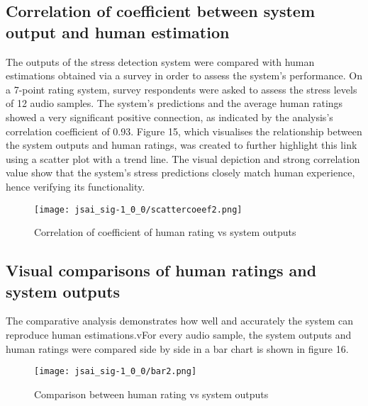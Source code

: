 \documentclass[a4j, twocolumn]{article}
\begin{document}
    \subsection{Correlation of coefficient between system output and human estimation}
    The outputs of the stress detection system were compared with human estimations obtained via a survey in order to assess the system's performance. On a 7-point rating system, survey respondents were asked to assess the stress levels of 12 audio samples. The system's predictions and the average human ratings showed a very significant positive connection, as indicated by the analysis's correlation coefficient of 0.93. Figure 15, which visualises the relationship between the system outputs and human ratings, was created to further highlight this link using a scatter plot with a trend line. The visual depiction and strong correlation value show that the system's stress predictions closely match human experience, hence verifying its functionality.
    \vspace{10pt} %
\begin{figure}[H]
    \centering
    \texttt{[image: jsai\_sig-1\_0\_0/scattercoeef2.png]}
    \caption{Correlation of coefficient of human rating vs system outputs}
    \label{fig:system_architecture}
\end{figure}
\vspace{10pt} %
\subsection{Visual comparisons of human ratings and system outputs }
The comparative analysis demonstrates how well and accurately the system  can reproduce human estimations.vFor every audio sample, the system outputs and human ratings were compared side by side in a bar chart is shown in figure 16.
\vspace{10pt} %
 \begin{figure}[H]
    \centering
    \texttt{[image: jsai\_sig-1\_0\_0/bar2.png]}
    \caption{Comparison between human rating vs system outputs}
    \label{fig:system_architecture}
\end{figure}
\vspace{10pt} %
\end{document}
